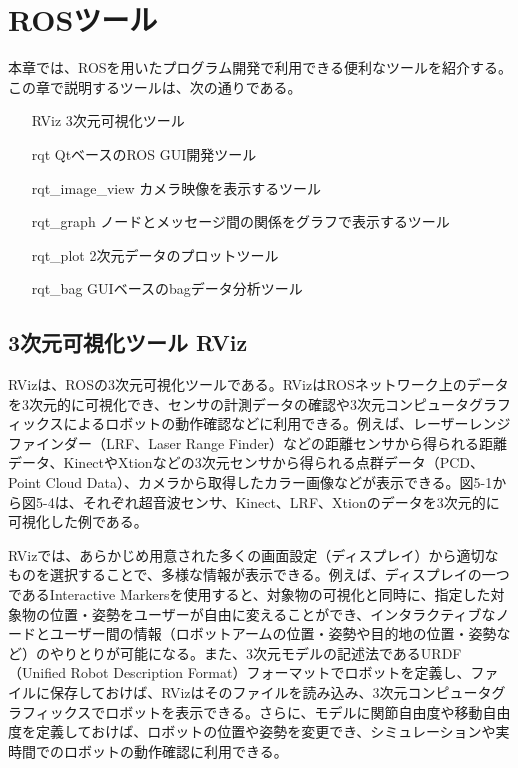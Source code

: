 
\chapter{ROSツール}

本章では、ROSを用いたプログラム開発で利用できる便利なツールを紹介する。この章で説明するツールは、次の通りである。

\begin{itemize}
\item [RViz] 3次元可視化ツール
\item [rqt] QtベースのROS GUI開発ツール
\item [rqt\_image\_view] カメラ映像を表示するツール
\item [rqt\_graph] ノードとメッセージ間の関係をグラフで表示するツール
\item [rqt\_plot] 2次元データのプロットツール
\item [rqt\_bag] GUIベースのbagデータ分析ツール
\end{itemize}

\section{3次元可視化ツール RViz}

RVizは、ROSの3次元可視化ツールである。RVizはROSネットワーク上のデータを3次元的に可視化でき、センサの計測データの確認や3次元コンピュータグラフィックスによるロボットの動作確認などに利用できる。例えば、レーザーレンジファインダー（LRF、Laser Range Finder）などの距離センサから得られる距離データ、KinectやXtionなどの3次元センサから得られる点群データ（PCD、Point Cloud Data）、カメラから取得したカラー画像などが表示できる。図5-1から図5-4は、それぞれ超音波センサ、Kinect、LRF、Xtionのデータを3次元的に可視化した例である。

RVizでは、あらかじめ用意された多くの画面設定（ディスプレイ）から適切なものを選択することで、多様な情報が表示できる。例えば、ディスプレイの一つであるInteractive Markersを使用すると、対象物の可視化と同時に、指定した対象物の位置・姿勢をユーザーが自由に変えることができ、インタラクティブなノードとユーザー間の情報（ロボットアームの位置・姿勢や目的地の位置・姿勢など）のやりとりが可能になる。また、3次元モデルの記述法であるURDF（Unified Robot Description Format）フォーマットでロボットを定義し、ファイルに保存しておけば、RVizはそのファイルを読み込み、3次元コンピュータグラフィックスでロボットを表示できる。さらに、モデルに関節自由度や移動自由度を定義しておけば、ロボットの位置や姿勢を変更でき、シミュレーションや実時間でのロボットの動作確認に利用できる。


